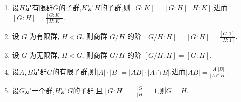 \documentclass[../../main.tex]{subfiles}%
\begin{document}
\begin{corollary}\label{corollary:抽象代数-推论 1.3.5}
\begin{enumerate}[(1)]
\item\label{corollary:抽象代数-推论 1.3.5-0} 设$H$是有限群$G$的子群,$K$是$H$的子群,则$[G:K]=[G:H][H:K]$,进而$[G:H]=\frac{[G:K]}{[H:K]}$.

\item\label{corollary:抽象代数-推论 1.3.5-1} 设 \( G \) 为有限群, \( H \lhd  G \), 则商群 \( G/H \) 的阶 \( [G/H : H] = [G : H] = \frac{[G:1]}{[H:1]} \).

\item\label{corollary:抽象代数-推论 1.3.5-2} 设 \( G \) 为无限群, \( H \lhd  G \), 则商群 \( G/H \) 的阶 \( [G/H : H] = [G : H] \).

\item\label{corollary:抽象代数-推论 1.3.5-3} 设$A,B$是群$G$的有限子群,则$|A|\cdot |B| = |AB|\cdot |A\cap B|$.进而$|AB|=\frac{|A||B|}{|A\cap B|}$.

\item\label{corollary:抽象代数-推论 1.3.5-4} 设$G$是一个群,$H$是$G$的子群,且$[G:H]=\frac{|G|}{|H|}=1$,则$G=H.$
\end{enumerate}
\end{corollary}
\end{document}
